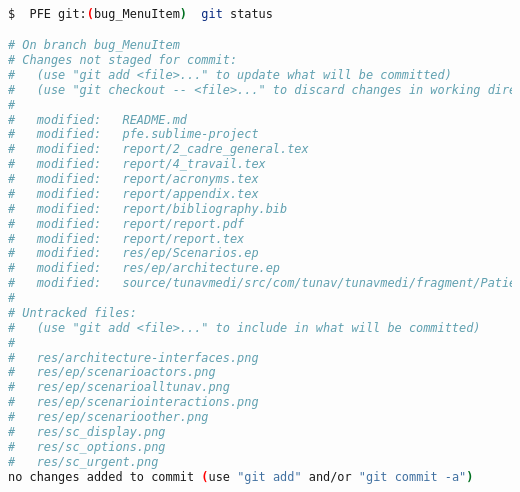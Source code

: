 \begin{lstlisting}[language=bash, label=lst:git_status, caption=Git status]

$  PFE git:(bug_MenuItem)  git status

# On branch bug_MenuItem
# Changes not staged for commit:
#   (use "git add <file>..." to update what will be committed)
#   (use "git checkout -- <file>..." to discard changes in working directory)
#
#   modified:   README.md
#   modified:   pfe.sublime-project
#   modified:   report/2_cadre_general.tex
#   modified:   report/4_travail.tex
#   modified:   report/acronyms.tex
#   modified:   report/appendix.tex
#   modified:   report/bibliography.bib
#   modified:   report/report.pdf
#   modified:   report/report.tex
#   modified:   res/ep/Scenarios.ep
#   modified:   res/ep/architecture.ep
#   modified:   source/tunavmedi/src/com/tunav/tunavmedi/fragment/PatientListFragment.java
#
# Untracked files:
#   (use "git add <file>..." to include in what will be committed)
#
#   res/architecture-interfaces.png
#   res/ep/scenarioactors.png
#   res/ep/scenarioalltunav.png
#   res/ep/scenariointeractions.png
#   res/ep/scenarioother.png
#   res/sc_display.png
#   res/sc_options.png
#   res/sc_urgent.png
no changes added to commit (use "git add" and/or "git commit -a")

\end{lstlisting}

